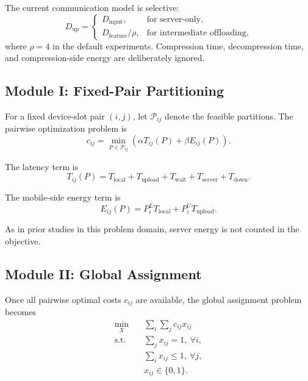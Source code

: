 \documentclass[conference]{IEEEtran}
\begin{document}
The current communication model is selective:
\begin{equation}
D_{\text{up}} =
\begin{cases}
D_{\text{input}}, & \text{for server-only}, \\
D_{\text{feature}} / \rho, & \text{for intermediate offloading},
\end{cases}
\end{equation}
where $\rho=4$ in the default experiments. Compression time,
decompression time, and compression-side energy are deliberately ignored.

\subsection{Module I: Fixed-Pair Partitioning}

For a fixed device-slot pair $(i,j)$, let $\mathcal{P}_{ij}$ denote the feasible
partitions. The pairwise optimization problem is
\begin{equation}
c_{ij} = \min_{P \in \mathcal{P}_{ij}} \left( \alpha T_{ij}(P) + \beta E_{ij}(P) \right).
\end{equation}

The latency term is
\begin{equation}
T_{ij}(P) = T_{\text{local}} + T_{\text{upload}} + T_{\text{wait}} + T_{\text{server}} + T_{\text{down}}.
\end{equation}

The mobile-side energy term is
\begin{equation}
E_{ij}(P) = P_i^L T_{\text{local}} + P_i^U T_{\text{upload}}.
\end{equation}

As in prior studies in this problem domain, server energy is not counted in the
objective.

\subsection{Module II: Global Assignment}

Once all pairwise optimal costs $c_{ij}$ are available, the global assignment
problem becomes
\begin{align}
\min_{X} \quad & \sum_i \sum_j c_{ij} x_{ij} \\
\text{s.t.} \quad & \sum_j x_{ij} = 1,\ \forall i, \\
& \sum_i x_{ij} \le 1,\ \forall j, \\
& x_{ij} \in \{0,1\}.
\end{align}
\end{document}
